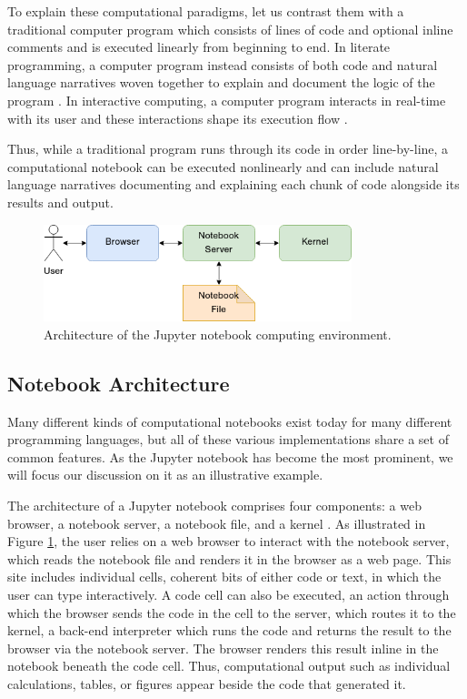 \documentclass[11pt,letterpaper]{article}
\begin{document}
To explain these computational paradigms, let us contrast them with a traditional computer program which consists of lines of code and optional inline comments and is executed linearly from beginning to end. In literate programming, a computer program instead consists of both code and natural language narratives woven together to explain and document the logic of the program \citep{knuth_literate_1992}. In interactive computing, a computer program interacts in real-time with its user and these interactions shape its execution flow \citep{perez_ipython:_2007}.

Thus, while a traditional program runs through its code in order line-by-line, a computational notebook can be executed nonlinearly and can include natural language narratives documenting and explaining each chunk of code alongside its results and output.

\begin{figure}[tbp]
	\centering
	\includegraphics[width=0.8\textwidth]{notebook-architecture.png}
	\caption{Architecture of the Jupyter notebook computing environment.}
	\label{fig:notebook_architecture}
\end{figure}

\subsection{Notebook Architecture}

Many different kinds of computational notebooks exist today for many different programming languages, but all of these various implementations share a set of common features. As the Jupyter notebook has become the most prominent, we will focus our discussion on it as an illustrative example.

The architecture of a Jupyter notebook comprises four components: a web browser, a notebook server, a notebook file, and a kernel \citep{kluyver_jupyter_2016}. As illustrated in Figure \ref{fig:notebook_architecture}, the user relies on a web browser to interact with the notebook server, which reads the notebook file and renders it in the browser as a web page. This site includes individual cells, coherent bits of either code or text, in which the user can type interactively. A code cell can also be executed, an action through which the browser sends the code in the cell to the server, which routes it to the kernel, a back-end interpreter which runs the code and returns the result to the browser via the notebook server. The browser renders this result inline in the notebook beneath the code cell. Thus, computational output such as individual calculations, tables, or figures appear beside the code that generated it.
\end{document}
